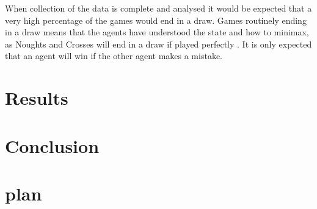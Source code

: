 \documentclass[conference]{IEEEtran}
\begin{document}
When collection of the data is complete and analysed it would be expected that a very high percentage of the games would end in a draw. Games routinely ending in a draw means that the agents have understood the state and how to minimax, as Noughts and Crosses will end in a draw if played perfectly \cite{qmuloxo}. It is only expected that an agent will win if the other agent makes a mistake.

\section{Results}



\section{Conclusion}

\section{plan}
\end{document}
